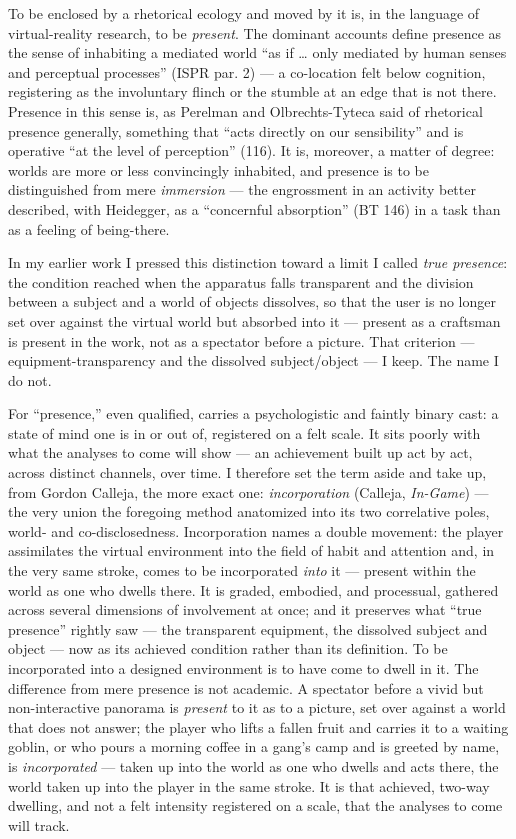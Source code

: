 \documentclass{article}
\begin{document}
To be enclosed by a rhetorical ecology and moved by it is, in the language of virtual-reality research, to be \textit{present}. The dominant accounts define presence as the sense of inhabiting a mediated world ``as if … only mediated by human senses and perceptual processes'' (ISPR par. 2) — a co-location felt below cognition, registering as the involuntary flinch or the stumble at an edge that is not there. Presence in this sense is, as Perelman and Olbrechts-Tyteca said of rhetorical presence generally, something that ``acts directly on our sensibility'' and is operative ``at the level of perception'' (116). It is, moreover, a matter of degree: worlds are more or less convincingly inhabited, and presence is to be distinguished from mere \textit{immersion} — the engrossment in an activity better described, with Heidegger, as a ``concernful absorption'' (BT 146) in a task than as a feeling of being-there.

In my earlier work I pressed this distinction toward a limit I called \textit{true presence}: the condition reached when the apparatus falls transparent and the division between a subject and a world of objects dissolves, so that the user is no longer set over against the virtual world but absorbed into it — present as a craftsman is present in the work, not as a spectator before a picture. That criterion — equipment-transparency and the dissolved subject/object — I keep. The name I do not.

For ``presence,'' even qualified, carries a psychologistic and faintly binary cast: a state of mind one is in or out of, registered on a felt scale. It sits poorly with what the analyses to come will show — an achievement built up act by act, across distinct channels, over time. I therefore set the term aside and take up, from Gordon Calleja, the more exact one: \textit{incorporation} (Calleja, \textit{In-Game}) — the very union the foregoing method anatomized into its two correlative poles, world- and co-disclosedness. Incorporation names a double movement: the player assimilates the virtual environment into the field of habit and attention and, in the very same stroke, comes to be incorporated \textit{into} it — present within the world as one who dwells there. It is graded, embodied, and processual, gathered across several dimensions of involvement at once; and it preserves what ``true presence'' rightly saw — the transparent equipment, the dissolved subject and object — now as its achieved condition rather than its definition. To be incorporated into a designed environment is to have come to dwell in it. The difference from mere presence is not academic. A spectator before a vivid but non-interactive panorama is \textit{present} to it as to a picture, set over against a world that does not answer; the player who lifts a fallen fruit and carries it to a waiting goblin, or who pours a morning coffee in a gang's camp and is greeted by name, is \textit{incorporated} — taken up into the world as one who dwells and acts there, the world taken up into the player in the same stroke. It is that achieved, two-way dwelling, and not a felt intensity registered on a scale, that the analyses to come will track.
\end{document}
